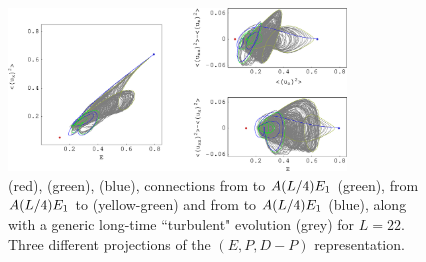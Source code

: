 \begin{figure}[t] 
\begin{center}
    \includegraphics[width=0.8\textwidth]{figs/ks22TurbConn_xfig.eps}
\end{center}
\caption{
 (red),  (green),  (blue), 
connections from  to $A(L/4)E_{1}$ (green),
from $A(L/4)E_{1}$ to  (yellow-green) 
and from  to $A(L/4)E_{1}$ (blue), along
with a generic long-time ``turbulent" evolution (grey) for $L=22$. 
Three different projections of the 
$(E,P,D-P)$
representation.
        }
\label{f:drivedragConn}
\end{figure}

